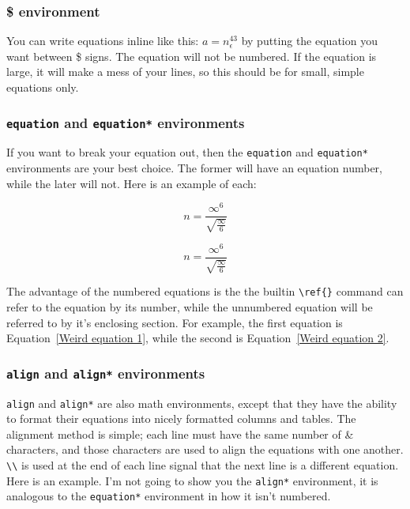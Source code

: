 \documentclass[letterpaper]{article}
\begin{document}
\subsubsection{\$ environment}

You can write equations inline like this: $a = n^{43}_\epsilon$ by 
putting the equation you want between \$ signs.  The equation will not 
be numbered.  If the equation is large, it will make a mess of your 
lines, so this should be for small, simple equations only.

\subsubsection{\texttt{equation} and \texttt{equation*} environments}

If you want to break your equation out, then the \texttt{equation} and 
\texttt{equation*} environments are your best choice.  The former will 
have an equation number, while the later will not.  Here is an example 
of each:

\begin{equation}
\label{Weird equation 1}
n = \frac{\infty^{6}}{\sqrt{\frac{\infty}{6}}}
\end{equation}

\begin{equation*}
\label{Weird equation 2}
n = \frac{\infty^{6}}{\sqrt{\frac{\infty}{6}}}
\end{equation*}

The advantage of the numbered equations is the the builtin \verb+\ref{}+ 
command can refer to the equation by its number, while the unnumbered 
equation will be referred to by it's enclosing section.  For example, 
the first equation is Equation~\ref{Weird equation 1}, while the second 
is Equation~\ref{Weird equation 2}.

\subsubsection{\texttt{align} and \texttt{align*} environments}

\texttt{align} and \texttt{align*} are also math environments, except 
that they have the ability to format their equations into nicely 
formatted columns and tables. The alignment method is simple; each line 
must have the same number of \& characters, and those characters are 
used to align the equations with one another. \verb+\\+ is used at the 
end of each line signal that the next line is a different equation.  
Here is an example.  I'm not going to show you the \texttt{align*} 
environment, it is analogous to the \texttt{equation*} environment in 
how it isn't numbered.
\end{document}
